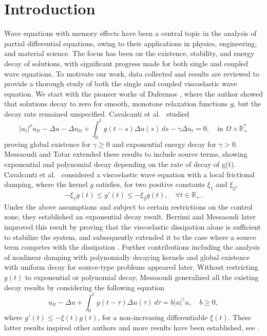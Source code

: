  \section{Introduction}
 
 Wave equations with memory effects have been a central topic in the analysis of partial
 differential equations, owing to their applications in physics, engineering, and material
 science. The focus has been on the existence, stability, and energy decay of solutions, with significant progress made for both single and coupled wave equations.
 To motivate our work, data collected and results are reviewed to provide a thorough study of
 both the single and coupled viscoelastic wave equation. We start with the pioneer works of Dafermos \cite{Dafermos1, Dafermos2}, where the author showed that solutions decay to zero
 for smooth, monotone relaxation functions $g$, but the decay rate remained unspecified. Cavalcanti et al.\ \cite{CavalcantiDS} studied
\[
|u_t|^\rho u_{tt} - \Delta u - \Delta u_{tt} + \int_0^t g(t - s) \Delta u(s) \, ds - \gamma \Delta u_t = 0,\quad \text{in } \Omega \times \mathbb{R}^{*}_{+}
\]
proving global existence for $\gamma \geq 0$ and exponential energy decay for $\gamma > 0$. Messaoudi and Tatar \cite{MTatar1, MTatar2} extended these results to include source terms, showing exponential and polynomial decay depending on the rate of decay of g(t).
Cavalcanti et al.\ \cite{CavalcantiFerreira} considered a viscoelastic wave equation with a
local frictional damping, where the kernel $g$ satisfies, for two positive constants $\xi_1$
and $\xi_2$,
\begin{align*}
-\xi_1 g(t) \leq g'(t) \leq -\xi_2 g(t), \quad \forall t \in \mathbb{R}_{+}.
\end{align*}
Under the above assumptions and subject to certain restrictions on the control zone, they established an exponential decay result. Berrimi and Messaoudi \cite{Berrimi2004} later
improved this result by proving that the viscoelastic dissipation alone is sufficient to stabilize the system, and subsequently extended it to the case where a source term competes with the dissipation \cite{Berrimi2006}.
Further contributions including the analysis of nonlinear damping with polynomially decaying kernels \cite{Cavalcanti2003} and global existence with uniform decay for source-type problems \cite{Li2011}  appeared later.
 Without restricting $g(t)$ to exponential or polynomial decay, Messaoudi \cite{SMessaoudi1, SMessaoudi2} generalized all the existing decay results by considering the following equation
\[
u_{tt} - \Delta u + \int_0^t g(t - \tau) \Delta u(\tau) \, d\tau = b |u|^{\gamma} u,\quad b \geq 0,
\]
where $g'(t) \leq -\xi(t) g(t)$, for a non-increasing differentiable $\xi(t)$.
These latter results inspired other authors and more results have been established, see \cite{SaidH2011, Hao, PJS, WSH, MessaoudiMustafa}.

